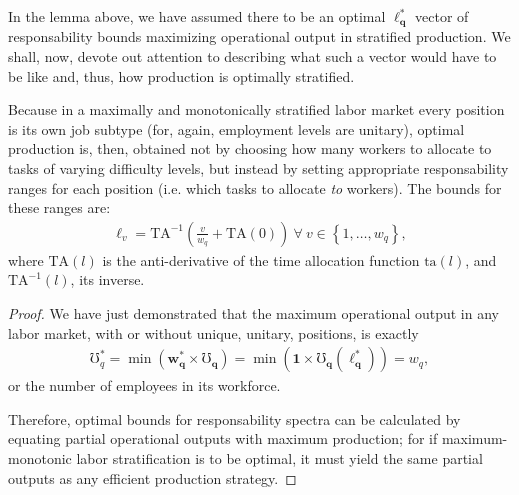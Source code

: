 \documentclass[hidelinks, nonatbib]{elsarticle}
\begin{document}
In the lemma above, we have assumed there to be an optimal $\boldsymbol{\ell_{q}^{*}}$ vector of responsability bounds maximizing operational output in stratified production. We shall, now, devote out attention to describing what such a vector would have to be like and, thus, how production is optimally stratified.
\begin{lemma}
    Because in a maximally and monotonically stratified labor market every position is its own job subtype (for, again, employment levels are unitary), optimal production is, then, obtained not by choosing how many workers to allocate to tasks of varying difficulty levels, but instead by setting appropriate responsability ranges for each position (i.e. which tasks to allocate \textit{to} workers). The bounds for these ranges are:
    \begin{gather}
    \ell_v
    =
    \text{TA}^{-1}\left(
        \frac{v}{w_q}
        +
        \text{TA}(0)
    \right)
    \
    \forall
    \
    v \in 
    \left\{
        1, \dots, w_q
    \right\}
    ,
    \end{gather}
    where $\text{TA}(l)$ is the anti-derivative of the time allocation function $\text{ta}(l)$, and $\text{TA}^{-1}(l)$, its inverse.
    
    \begin{proof}
        
        We have just demonstrated that the maximum operational output in any labor market, with or without unique, unitary, positions, is exactly 
        \begin{gather}
        \mho_{q}^{*}
            =
            \min(
                \boldsymbol{w_{q}^{*}}
                \times
                \boldsymbol{\mho_q}
            )
            = 
            \min(
                \boldsymbol{1}
                \times
                \boldsymbol{\mho_q}(
                    \boldsymbol{\ell_{q}^{*}}
                )
            )
            =
            w_q
        ,
        \end{gather}
        or the number of employees in its workforce.
        
        Therefore, optimal bounds for responsability spectra can be calculated by equating partial operational outputs with maximum production; for if maximum-monotonic labor stratification is to be optimal, it must yield the same partial outputs as any efficient production strategy.
        

\end{proof}
\end{lemma}
\end{document}

